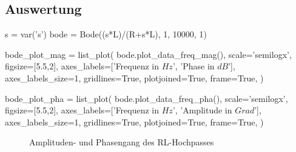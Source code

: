 \subsection{Auswertung}

\begin{sagesilent}
    s = var('s')
    bode = Bode((s*L)/(R+s*L), 1, 10000, 1)

    bode_plot_mag = list_plot(
        bode.plot_data_freq_mag(),
        scale='semilogx',
        figsize=[5.5,2],
        axes_labels=['Frequenz in $Hz$', 'Phase in $dB$'],
        axes_labels_size=1,
        gridlines=True,
        plotjoined=True,
        frame=True,
    )

    bode_plot_pha = list_plot(
        bode.plot_data_freq_pha(),
        scale='semilogx',
        figsize=[5.5,2],
        axes_labels=['Frequenz in $Hz$', 'Amplitude in $Grad$'],
        axes_labels_size=1,
        gridlines=True,
        plotjoined=True,
        frame=True,
    )
\end{sagesilent}

\begin{figure}[H]
    \centering
    \begin{subfigure}{\textwidth}
        \centering
    \end{subfigure}
    \quad
    \begin{subfigure}{\textwidth}
        \centering
    \end{subfigure}
    \caption{Amplituden- und Phasengang des RL-Hochpasses}
\end{figure}
